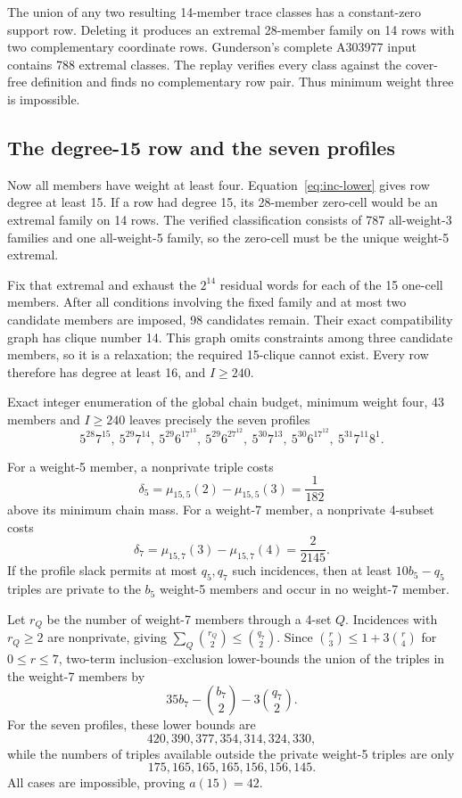 \documentclass[11pt]{article}
\newcommand{\binomc}[2]{\binom{#1}{#2}}
\begin{document}
The union of any two resulting 14-member trace classes has a constant-zero
support row.  Deleting it produces an extremal 28-member family on 14 rows
with two complementary coordinate rows.  Gunderson's complete A303977
input~\cite{oeis-a303977} contains 788 extremal classes.  The replay verifies
every class against the cover-free
definition and finds no complementary row pair.  Thus minimum weight three is
impossible.

\subsection{The degree-15 row and the seven profiles}

Now all members have weight at least four.  Equation~\eqref{eq:inc-lower}
gives row degree at least 15.  If a row had degree 15, its 28-member zero-cell
would be an extremal family on 14 rows.  The verified classification consists
of 787 all-weight-3 families and one all-weight-5 family, so the zero-cell
must be the unique weight-5 extremal.

Fix that extremal and exhaust the $2^{14}$ residual words for each of the 15
one-cell members.  After all conditions involving the fixed family and at
most two candidate members are imposed, 98 candidates remain.  Their exact
compatibility graph has clique number 14.  This graph omits constraints among
three candidate members, so it is a relaxation; the required 15-clique cannot
exist.  Every row therefore has degree at least 16, and $I\geq240$.

Exact integer enumeration of the global chain budget, minimum weight four,
43 members and $I\geq240$ leaves precisely the seven profiles
\[
 5^{28}7^{15},\ 5^{29}7^{14},\ 5^{29}6^17^{13},\
 5^{29}6^27^{12},\ 5^{30}7^{13},\ 5^{30}6^17^{12},\
 5^{31}7^{11}8^1.
\]

For a weight-5 member, a nonprivate triple costs
\[
 \delta_5=\mu_{15,5}(2)-\mu_{15,5}(3)=\frac1{182}
\]
above its minimum chain mass.  For a weight-7 member, a nonprivate 4-subset
costs
\[
 \delta_7=\mu_{15,7}(3)-\mu_{15,7}(4)=\frac2{2145}.
\]
If the profile slack permits at most $q_5,q_7$ such incidences, then at least
$10b_5-q_5$ triples are private to the $b_5$ weight-5 members and occur in no
weight-7 member.

Let $r_Q$ be the number of weight-7 members through a 4-set $Q$.  Incidences
with $r_Q\geq2$ are nonprivate, giving
$\sum_Q\binomc{r_Q}2\leq\binomc{q_7}2$.  Since
$\binomc r3\leq1+3\binomc r4$ for $0\leq r\leq7$, two-term
inclusion--exclusion lower-bounds the union of the triples in the weight-7
members by
\begin{equation}\label{eq:tripleunion}
 35b_7-\binomc{b_7}2-3\binomc{q_7}2.
\end{equation}
For the seven profiles, these lower bounds are
\[
420,390,377,354,314,324,330,
\]
while the numbers of triples available outside the private weight-5 triples
are only
\[
175,165,165,165,156,156,145.
\]
All cases are impossible, proving $a(15)=42$.
\end{document}
